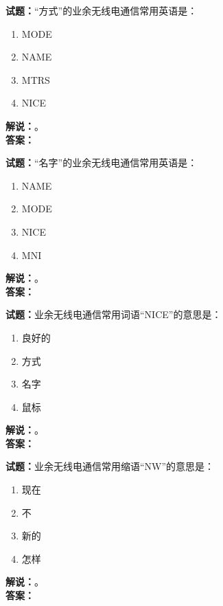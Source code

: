 \documentclass{ctexbook}
\begin{document}
\bigskip




\noindent\textbf{试题：}“方式”的业余无线电通信常用英语是：
\begin{enumerate}[leftmargin=3em]
\item MODE
\item NAME
\item MTRS
\item NICE
\end{enumerate}
\noindent\textbf{解说：}\textbf{}。\\\noindent\textbf{答案：}

\bigskip




\noindent\textbf{试题：}“名字”的业余无线电通信常用英语是：
\begin{enumerate}[leftmargin=3em]
\item NAME
\item MODE
\item NICE
\item MNI
\end{enumerate}
\noindent\textbf{解说：}\textbf{}。\\\noindent\textbf{答案：}

\bigskip




\noindent\textbf{试题：}业余无线电通信常用词语“NICE”的意思是：
\begin{enumerate}[leftmargin=3em]
\item 良好的
\item 方式
\item 名字
\item 鼠标
\end{enumerate}
\noindent\textbf{解说：}\textbf{}。\\\noindent\textbf{答案：}

\bigskip




\noindent\textbf{试题：}业余无线电通信常用缩语“NW”的意思是：
\begin{enumerate}[leftmargin=3em]
\item 现在
\item 不
\item 新的
\item 怎样
\end{enumerate}
\noindent\textbf{解说：}\textbf{}。\\\noindent\textbf{答案：}

\bigskip
\end{document}
